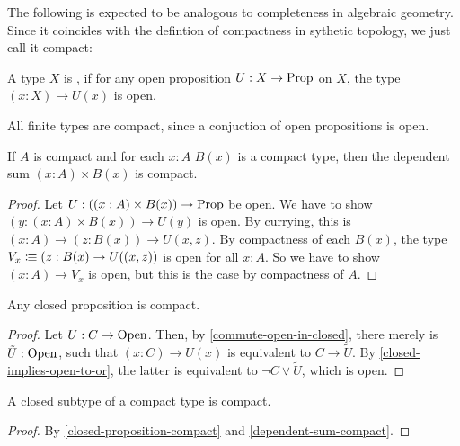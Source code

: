 
The following is expected to be analogous to completeness in algebraic geometry.
Since it coincides with the defintion of compactness in sythetic topology,
we just call it compact:

\begin{definition}
  A type $X$ is ,
  if for any open proposition $U:X\to\mathrm{Prop}$ on $X$,
  the type $(x:X)\to U(x)$ is open.
\end{definition}

\begin{example}
  All finite types are compact, since a conjuction of open propositions is open.
\end{example}

\begin{lemma}
  \label{dependent-sum-compact}
  If $A$ is compact and for each $x:A$ $B(x)$ is a compact type,
  then the dependent sum $(x:A)\times B(x)$ is compact.
\end{lemma}

\begin{proof}
  Let $U:((x:A)\times B(x))\to\mathrm{Prop}$ be open.
  We have to show $(y:(x:A)\times B(x))\to U(y)$ is open.
  By currying, this is $(x:A)\to (z:B(x))\to U(x,z)$.
  By compactness of each $B(x)$, the type $V_x\vcentcolon\mspace{-1.2mu}\equiv (z:B(x)\to U((x,z))$ is open for all $x:A$.
  So we have to show $(x:A)\to V_x$ is open, but this is the case by compactness of $A$.
\end{proof}

\begin{lemma}
  \label{closed-proposition-compact}
  Any closed proposition is compact.
\end{lemma}

\begin{proof}
  Let $U:C\to\mathrm{Open}$.
  Then, by \cref{commute-open-in-closed}, there merely is $\tilde{U}:\mathrm{Open}$,
  such that $(x:C)\to U(x)$ is equivalent to $C\to\tilde{U}$.
  By \cref{closed-implies-open-to-or}, the latter is equivalent to $\neg C\vee \tilde{U}$,
  which is open.
\end{proof}

\begin{lemma}
  \label{closed-subtype-compact}
  A closed subtype of a compact type is compact.
\end{lemma}

\begin{proof}
  By \cref{closed-proposition-compact} and \cref{dependent-sum-compact}.
\end{proof}

